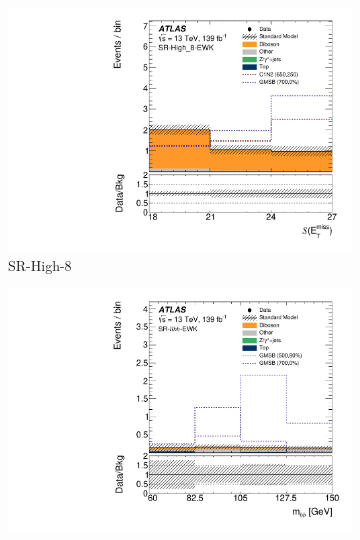 \begin{figure}[tp]
\centering
\begin{subfigure}{0.495\textwidth}
\centering
\includegraphics[width=\textwidth]{figures/2ljets_sr_high_8_met_sig.pdf}
\caption{SR-High-8}
\end{subfigure}
\hfill
\begin{subfigure}{0.495\textwidth}
\centering
\includegraphics[width=\textwidth]{figures/2ljets_sr_llbb_mbb.pdf}
\caption{\srllbb}
\end{subfigure}
\\[0.5em]
\begin{subfigure}{0.495\textwidth}
\centering

\end{subfigure}
\end{figure}
